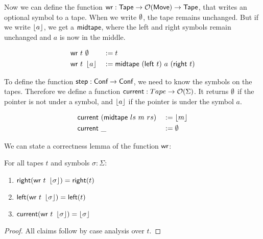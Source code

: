 
Now we can define the function $\textsf{wr} : \textsf{Tape} \rightarrow \mathcal{O}(\textsf{Move}) \rightarrow \textsf{Tape}$, that writes an optional symbol to a tape.  When we write $\emptyset$,
the tape remains unchanged.  But if we write $\left\lfloor {a} \right\rfloor$, we get a $\textsf{midtape}$, where the left and right symbols remain unchanged and $a$ is now in
the middle.

\begin{definition}[$\MS{wr}$]
  \begin{alignat*}{3}
    \textsf{wr}~t &~ \emptyset   &&:= t \\
    \textsf{wr}~t &~ \left\lfloor {a} \right\rfloor &&:= \textsf{midtape}~(\textsf{left}~t)~{a}~(\textsf{right}~t)
  \end{alignat*}
\end{definition}

To define the function $\textsf{step} : \textsf{Conf} \rightarrow \textsf{Conf}$, we need to know the symbols on the tapes.  Therefore we define a function
$\textsf{current} : Tape \rightarrow \mathcal{O}(\Sigma)$.  It returns $\emptyset$ if the pointer is not under a symbol, and $\left\lfloor {a} \right\rfloor$ if the pointer is under the
symbol $a$.

\begin{definition}[$\MS{current}$]
  \begin{alignat*}{2}
    \textsf{current}&~(\textsf{midtape}~{ls}~{m}~{rs})&&:= \left\lfloor {m} \right\rfloor \\
    \textsf{current}&~\_                          &&:= \emptyset
  \end{alignat*}
\end{definition}

We can state a correctness lemma of the function $\MS{wr}$:

\begin{lemma}[Correctness of $\MS{wr}$]
  \label{lem:write}
  For all tapes $t$ and symbols $\sigma:\Sigma$:
  \begin{enumerate}
  \item $\textsf{right}   (\textsf{wr}~t~\left\lfloor {\sigma} \right\rfloor) = \textsf{right}(t)$
  \item $\textsf{left}    (\textsf{wr}~t~\left\lfloor {\sigma} \right\rfloor) = \textsf{left} (t)$
  \item $\textsf{current} (\textsf{wr}~t~\left\lfloor {\sigma} \right\rfloor) = \left\lfloor {\sigma} \right\rfloor$
  \end{enumerate}
\end{lemma}
\begin{proof}
  All claims follow by case analysis over $t$.
\end{proof}

